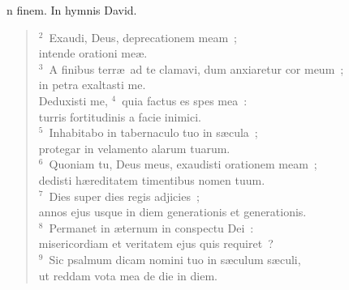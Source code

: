 \bchapter
{}n finem. In hymnis David.
\begin{flushleft}\begin{verse}\vspace{6pt}${}^{2}$~Exaudi, Deus, deprecationem meam~;\\ intende orationi me\ae .\\
${}^{3}$~A finibus terr\ae\ ad te clamavi, dum anxiaretur cor meum~;\\ in petra exaltasti me.\\ Deduxisti me,
${}^{4}$~quia factus es spes mea~:\\ turris fortitudinis a facie inimici.\\
${}^{5}$~Inhabitabo in tabernaculo tuo in s\ae cula~;\\ protegar in velamento alarum tuarum.\\
${}^{6}$~Quoniam tu, Deus meus, exaudisti orationem meam~;\\ dedisti h\ae reditatem timentibus nomen tuum.\\
${}^{7}$~Dies super dies regis adjicies~;\\ annos ejus usque in diem generationis et generationis.\\
${}^{8}$~Permanet in \ae ternum in conspectu Dei~:\\ misericordiam et veritatem ejus quis requiret~?\\
${}^{9}$~Sic psalmum dicam nomini tuo in s\ae culum s\ae culi,\\ ut reddam vota mea de die in diem.\end{verse}\end{flushleft}



